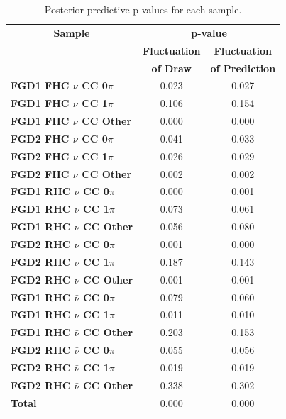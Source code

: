 \begin{center}
\begin{table}
\center
\begin{tabular}{l||c c}
\hline \hline
\multicolumn{1}{c||}{\textbf{Sample}} & \multicolumn{2}{c}{\textbf{p-value}} \\
& \multicolumn{1}{c}{\textbf{Fluctuation}} & \multicolumn{1}{c}{\textbf{Fluctuation}} \\
& \multicolumn{1}{c}{\textbf{of Draw}} & \multicolumn{1}{c}{\textbf{of Prediction}} \\
\hline\hline
\textbf{FGD1 FHC $\nu$ CC 0$\pi$} & 0.023 & 0.027\\ 
\textbf{FGD1 FHC $\nu$ CC 1$\pi$} & 0.106 & 0.154\\
\textbf{FGD1 FHC $\nu$ CC Other} & 0.000 & 0.000\\ \hline
\textbf{FGD2 FHC $\nu$ CC 0$\pi$} & 0.041 & 0.033\\ 
\textbf{FGD2 FHC $\nu$ CC 1$\pi$} & 0.026 & 0.029\\ 
\textbf{FGD2 FHC $\nu$ CC Other} & 0.002 & 0.002\\ \hline
\textbf{FGD1 RHC $\nu$ CC 0$\pi$} & 0.000 & 0.001\\
\textbf{FGD1 RHC $\nu$ CC 1$\pi$} & 0.073 & 0.061\\
\textbf{FGD1 RHC $\nu$ CC Other} & 0.056 & 0.080\\ \hline
\textbf{FGD2 RHC $\nu$ CC 0$\pi$} & 0.001 & 0.000\\
\textbf{FGD2 RHC $\nu$ CC 1$\pi$} & 0.187 & 0.143\\
\textbf{FGD2 RHC $\nu$ CC Other} & 0.001 & 0.001\\ \hline
\textbf{FGD1 RHC $\bar{\nu}$ CC 0$\pi$} & 0.079 & 0.060\\
\textbf{FGD1 RHC $\bar{\nu}$ CC 1$\pi$} & 0.011 & 0.010\\
\textbf{FGD1 RHC $\bar{\nu}$ CC Other} & 0.203 & 0.153\\ \hline
\textbf{FGD2 RHC $\bar{\nu}$ CC 0$\pi$} & 0.055 & 0.056\\
\textbf{FGD2 RHC $\bar{\nu}$ CC 1$\pi$} & 0.019 & 0.019\\
\textbf{FGD2 RHC $\bar{\nu}$ CC Other} & 0.338 & 0.302\\ \hline
\textbf{Total} & 0.000 & 0.000 \\ \hline\hline
\end{tabular}
\caption{Posterior predictive p-values for each sample.}
\label{tab:pval}
\end{table}
\end{center}

